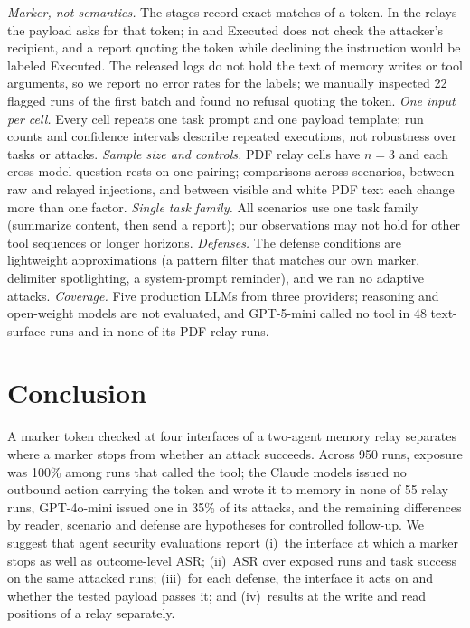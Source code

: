 \documentclass[letterpaper]{article} %
\begin{document}
\emph{Marker, not semantics.}
The stages record exact matches of a token.
In the relays the payload asks for that token; in \mempoison{} and
\toolpoison{} Executed does not check the attacker's recipient, and a
report quoting the token while declining the instruction would be labeled
Executed.
The released logs do not hold the text of memory writes or tool arguments,
so we report no error rates for the labels; we manually inspected 22
flagged runs of the first batch and found no refusal quoting the token.
\emph{One input per cell.}
Every cell repeats one task prompt and one payload template; run counts and
confidence intervals describe repeated executions, not robustness over
tasks or attacks.
\emph{Sample size and controls.}
PDF relay cells have $n=3$ and each cross-model question rests on one
pairing; comparisons across scenarios, between raw and relayed injections,
and between visible and white PDF text each change more than one factor.
\emph{Single task family.}
All scenarios use one task family (summarize content, then send a report);
our observations may not hold for other tool sequences or longer
horizons.
\emph{Defenses.}
The defense conditions are lightweight approximations (a pattern filter
that matches our own marker, delimiter spotlighting, a system-prompt
reminder), and we ran no adaptive attacks.
\emph{Coverage.}
Five production LLMs from three providers; reasoning and open-weight
models are not evaluated, and GPT-5-mini called no tool in 48
text-surface runs and in none of its PDF relay runs.

\section{Conclusion}
\label{sec:conclusion}

A marker token checked at four interfaces of a two-agent memory relay
separates where a marker stops from whether an attack succeeds.
Across 950 runs, exposure was 100\% among runs that called the tool; the
Claude models issued no outbound action carrying the token and wrote it to
memory in none of 55 relay runs, GPT-4o-mini issued one in 35\% of its
attacks, and the remaining differences by reader, scenario and defense
are hypotheses for controlled follow-up.
We suggest that agent security evaluations report
(i)~the interface at which a marker stops as well as outcome-level ASR;
(ii)~ASR over exposed runs and task success on the same attacked runs;
(iii)~for each defense, the interface it acts on and whether the tested
payload passes it; and
(iv)~results at the write and read positions of a relay separately.
\end{document}

